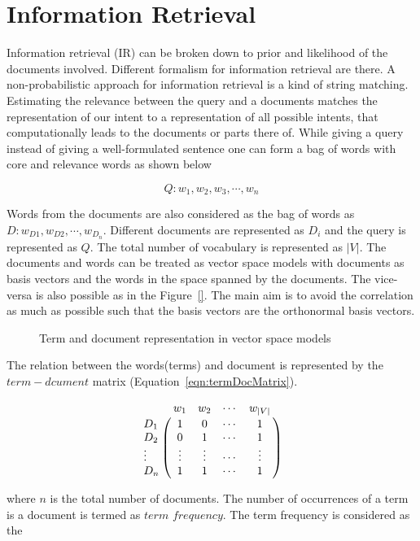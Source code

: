\documentclass{bmcart}
\begin{document}
\section{Information Retrieval}
\label{sec:ir}
Information retrieval (IR)  can be broken  down to prior and likelihood of the documents involved.  Different formalism for information retrieval are there. A non-probabilistic approach for information retrieval is a kind of string matching. Estimating the relevance between the query and a documents matches the representation of our intent to a representation of all possible intents, that computationally leads to the documents or parts there of. While giving a query instead of giving a well-formulated sentence one can form a bag of words with core and relevance words as shown below
\begin{center}
\begin{equation}
Q:{w_1,w_2,w_3,\cdots,w_n}
\end{equation}
\label{eqn:queryBagofWords}
\end{center}
Words from the documents are also considered as the bag of words as $D:{w_{D1},w_{D2},\cdots,w_{D_n}}$. Different documents are represented as $D_i$ and the query is represented as $Q$. The total number of vocabulary is represented as $|V|$. The documents and words can be treated as vector space models with documents as basis vectors and the words in the space spanned by the documents. The vice-versa is also possible as in the Figure~\ref{}. The main aim is to avoid the correlation as much as possible such that the basis vectors are the orthonormal basis vectors.
\begin{figure}[h!tb]
\centering
{}
\caption{Term and document representation in vector space models}
\end{figure}
The relation between the words(terms) and document is represented by the $term-dcument$ matrix (Equation~\ref{eqn:termDocMatrix}).
\begin{center}
\begin{equation}
\bordermatrix{~ & w_1 & w_2 & \cdots & w_{|V|} \cr
                  D_1 & 1 & 0 & \cdots & 1 \cr
                  D_2 & 0 & 1 & \cdots & 1 \cr
                  \vdots & \vdots &  \vdots & \cdots & \vdots \cr
                  D_n & 1 & 1 & \cdots & 1}
\end{equation}
\label{eqn:termDocMatrix}
\end{center}
where $n$ is the total number of documents. The number of occurrences of a term is a  document is termed as $term$ $frequency$. The term frequency is considered as the 
\end{document}
